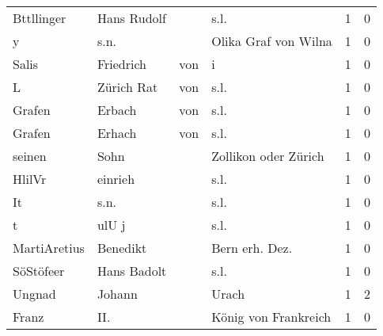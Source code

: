 \begin{tabular}{llllrr}
               Bttllinger &                        Hans Rudolf &             &                                        s.l. &          1 &         0 \\
                        y &                               s.n. &             &                        Olika Graf von Wilna &          1 &         0 \\
                    Salis &                          Friedrich &         von &                                           i &          1 &         0 \\
                        L &                         Zürich Rat &         von &                                        s.l. &          1 &         0 \\
                   Grafen &                             Erbach &         von &                                        s.l. &          1 &         0 \\
                   Grafen &                             Erhach &         von &                                        s.l. &          1 &         0 \\
                   seinen &                               Sohn &             &                        Zollikon oder Zürich &          1 &         0 \\
                   HlilVr &                            einrieh &             &                                        s.l. &          1 &         0 \\
                       It &                               s.n. &             &                                        s.l. &          1 &         0 \\
                        t &                              ulU j &             &                                        s.l. &          1 &         0 \\
             MartiAretius &                           Benedikt &             &                             Bern erh. Dez.  &          1 &         0 \\
                SöStöfeer &                        Hans Badolt &             &                                        s.l. &          1 &         0 \\
                   Ungnad &                             Johann &             &                                       Urach &          1 &         2 \\
                    Franz &                                II. &             &                        König von Frankreich &          1 &         0 \\

\end{tabular}
